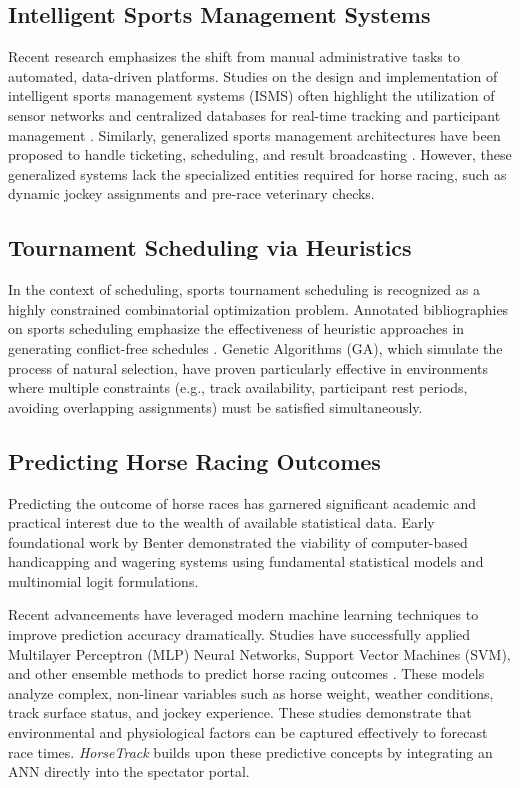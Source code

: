 \documentclass{llncs}
\begin{document}
\subsection{Intelligent Sports Management Systems}
Recent research emphasizes the shift from manual administrative tasks to automated, data-driven platforms. Studies on the design and implementation of intelligent sports management systems (ISMS) often highlight the utilization of sensor networks and centralized databases for real-time tracking and participant management \cite{ref_isms}. Similarly, generalized sports management architectures have been proposed to handle ticketing, scheduling, and result broadcasting \cite{ref_wiley}. However, these generalized systems lack the specialized entities required for horse racing, such as dynamic jockey assignments and pre-race veterinary checks.

\subsection{Tournament Scheduling via Heuristics}
In the context of scheduling, sports tournament scheduling is recognized as a highly constrained combinatorial optimization problem. Annotated bibliographies on sports scheduling emphasize the effectiveness of heuristic approaches in generating conflict-free schedules \cite{ref_scheduling_bib}. Genetic Algorithms (GA), which simulate the process of natural selection, have proven particularly effective in environments where multiple constraints (e.g., track availability, participant rest periods, avoiding overlapping assignments) must be satisfied simultaneously.

\subsection{Predicting Horse Racing Outcomes}
Predicting the outcome of horse races has garnered significant academic and practical interest due to the wealth of available statistical data. Early foundational work by Benter \cite{ref_benter} demonstrated the viability of computer-based handicapping and wagering systems using fundamental statistical models and multinomial logit formulations. 

Recent advancements have leveraged modern machine learning techniques to improve prediction accuracy dramatically. Studies have successfully applied Multilayer Perceptron (MLP) Neural Networks, Support Vector Machines (SVM), and other ensemble methods to predict horse racing outcomes \cite{ref_doi_1,ref_nyc_blog,ref_pmc_predict}. These models analyze complex, non-linear variables such as horse weight, weather conditions, track surface status, and jockey experience. These studies demonstrate that environmental and physiological factors can be captured effectively to forecast race times. \textit{HorseTrack} builds upon these predictive concepts by integrating an ANN directly into the spectator portal.
\end{document}
